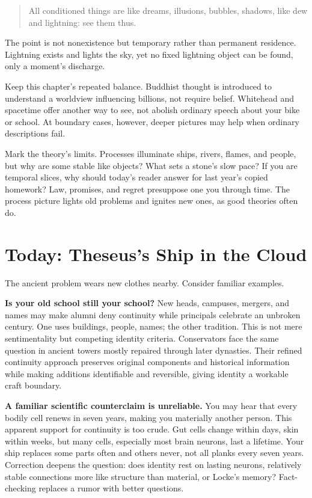 \begin{quote}
All conditioned things are like dreams, illusions, bubbles, shadows, like dew and lightning: see them thus.
\end{quote}
The point is not nonexistence but temporary rather than permanent residence. Lightning exists and lights the sky, yet no fixed lightning object can be found, only a moment's discharge.

Keep this chapter's repeated balance. Buddhist thought is introduced to understand a worldview influencing billions, not require belief. Whitehead and spacetime offer another way to see, not abolish ordinary speech about your bike or school. At boundary cases, however, deeper pictures may help when ordinary descriptions fail.

Mark the theory's limits. Processes illuminate ships, rivers, flames, and people, but why are some stable like objects? What sets a stone's slow pace? If you are temporal slices, why should today's reader answer for last year's copied homework? Law, promises, and regret presuppose one you through time. The process picture lights old problems and ignites new ones, as good theories often do.

\section{Today: Theseus's Ship in the Cloud}
The ancient problem wears new clothes nearby. Consider familiar examples.

\textbf{Is your old school still your school?} New heads, campuses, mergers, and names may make alumni deny continuity while principals celebrate an unbroken century. One uses buildings, people, names; the other tradition. This is not mere sentimentality but competing identity criteria. Conservators face the same question in ancient towers mostly repaired through later dynasties. Their refined continuity approach preserves original components and historical information while making additions identifiable and reversible, giving identity a workable craft boundary.

\textbf{A familiar scientific counterclaim is unreliable.} You may hear that every bodily cell renews in seven years, making you materially another person. This apparent support for continuity is too crude. Gut cells change within days, skin within weeks, but many cells, especially most brain neurons, last a lifetime. Your ship replaces some parts often and others never, not all planks every seven years. Correction deepens the question: does identity rest on lasting neurons, relatively stable connections more like structure than material, or Locke's memory? Fact-checking replaces a rumor with better questions.

